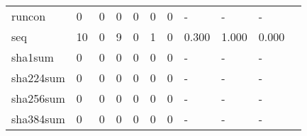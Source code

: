 \begin{longtable}{lp{1.20cm}p{1.20cm}p{1.20cm}p{1.20cm}p{1.20cm}p{1.20cm}p{1.20cm}p{1.20cm}p{1.20cm}p{1.20cm}}
runcon    &                                     0 &                                                  0 &                                                  0 &                                                  0 &                                                  0 &                                                  0 &                                             - &                                                  - &                                                  - \\
seq       &                                    10 &                                                  0 &                                                  9 &                                                  0 &                                                  1 &                                                  0 &                                         0.300 &                                              1.000 &                                              0.000 \\
sha1sum   &                                     0 &                                                  0 &                                                  0 &                                                  0 &                                                  0 &                                                  0 &                                             - &                                                  - &                                                  - \\
sha224sum &                                     0 &                                                  0 &                                                  0 &                                                  0 &                                                  0 &                                                  0 &                                             - &                                                  - &                                                  - \\
sha256sum &                                     0 &                                                  0 &                                                  0 &                                                  0 &                                                  0 &                                                  0 &                                             - &                                                  - &                                                  - \\
sha384sum &                                     0 &                                                  0 &                                                  0 &                                                  0 &                                                  0 &                                                  0 &                                             - &                                                  - &                                                  - \\

\end{longtable}
